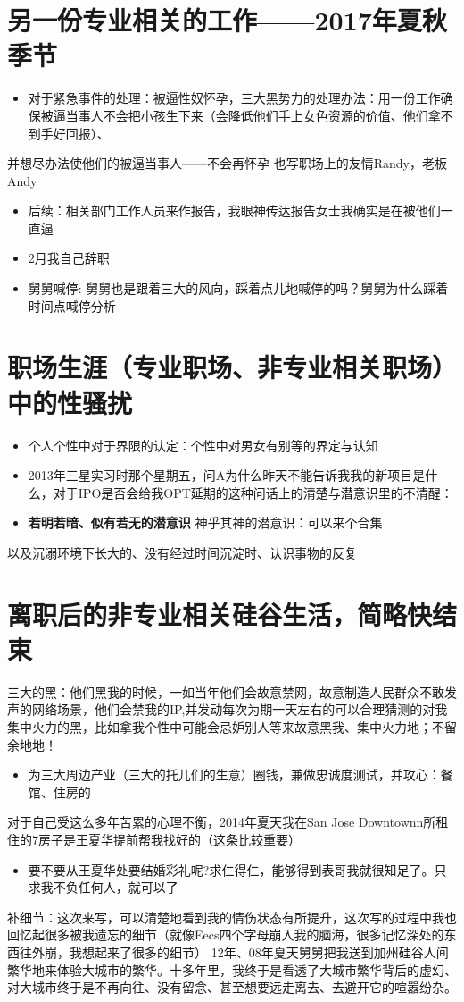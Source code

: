 \documentclass[9pt, b5paper]{article}
\begin{document}
\section{另一份专业相关的工作——2017年夏秋季节}
\label{sec:org758663a}
\begin{itemize}
\item 对于紧急事件的处理：被逼性奴怀孕，三大黑势力的处理办法：用一份工作确保被逼当事人不会把小孩生下来（会降低他们手上女色资源的价值、他们拿不到手好回报）、
\end{itemize}
并想尽办法使他们的被逼当事人——不会再怀孕
也写职场上的友情Randy，老板Andy
\begin{itemize}
\item 后续：相关部门工作人员来作报告，我眼神传达报告女士我确实是在被他们一直逼
\item 2月我自己辞职
\item 舅舅喊停: 舅舅也是跟着三大的风向，踩着点儿地喊停的吗？舅舅为什么踩着时间点喊停分析
\end{itemize}

\section{职场生涯（专业职场、非专业相关职场）中的性骚扰}
\label{sec:orgd8967a4}
\begin{itemize}
\item 个人个性中对于界限的认定：个性中对男女有别等的界定与认知
\item 2013年三星实习时那个星期五，问A为什么昨天不能告诉我我的新项目是什么，对于IPO是否会给我OPT延期的这种问话上的清楚与潜意识里的不清醒：
\item \textbf{若明若暗、似有若无的潜意识} 神乎其神的潜意识：可以来个合集
\end{itemize}
以及沉溺环境下长大的、没有经过时间沉淀时、认识事物的反复

\section{离职后的非专业相关硅谷生活，简略快结束}
\label{sec:orga743101}
三大的黑：他们黑我的时候，一如当年他们会故意禁网，故意制造人民群众不敢发声的网络场景，他们会禁我的IP,并发动每次为期一天左右的可以合理猜测的对我集中火力的黑，比如拿我个性中可能会忌妒别人等来故意黑我、集中火力地；不留余地地！
\begin{itemize}
\item 为三大周边产业（三大的托儿们的生意）圈钱，兼做忠诚度测试，并攻心：餐馆、住房的
\end{itemize}
对于自己受这么多年苦累的心理不衡，2014年夏天我在San Jose Downtownn所租住的7房子是王夏华提前帮我找好的（这条比较重要）
\begin{itemize}
\item 要不要从王夏华处要结婚彩礼呢?求仁得仁，能够得到表哥我就很知足了。只求我不负任何人，就可以了
\end{itemize}
补细节：这次来写，可以清楚地看到我的情伤状态有所提升，这次写的过程中我也回忆起很多被我遗忘的细节（就像Eecs四个字母崩入我的脑海，很多记忆深处的东西往外崩，我想起来了很多的细节）
12年、08年夏天舅舅把我送到加州硅谷人间繁华地来体验大城市的繁华。十多年里，我终于是看透了大城市繁华背后的虚幻、对大城市终于是不再向往、没有留念、甚至想要远走离去、去避开它的喧嚣纷杂。
\end{document}

